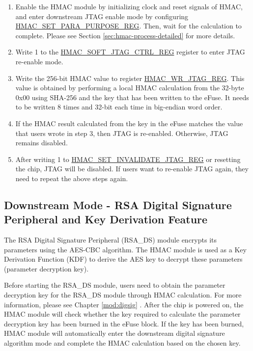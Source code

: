 \documentclass[main\_\_EN.tex]{subfiles}
\begin{document}
\begin{enumerate}
\item Enable the HMAC module by initializing clock and reset signals of HMAC, and enter downstream JTAG enable mode by configuring \hyperref[regdesc:HMACSETPARAPURPOSEREG]{HMAC\_SET\_PARA\_PURPOSE\_REG}. Then, wait for the calculation to complete. Please see Section \ref{sec:hmac-process-detailed} for more details.
\item Write 1 to the \hyperref[regdesc:HMACSOFTJTAGCTRLREG]{HMAC\_SOFT\_JTAG\_CTRL\_REG} register to enter JTAG re-enable mode.
\item Write the 256-bit HMAC value to register \hyperref[regdesc:HMACWRJTAGREG]{HMAC\_WR\_JTAG\_REG}. This value is obtained by performing a local HMAC calculation from the 32-byte 0x00 using SHA-256 and the key that has been written to the eFuse. It needs to be written 8 times and 32-bit each time in big-endian word order.
\item If the HMAC result calculated from the key in the eFuse matches the value that users wrote in step 3, then JTAG is re-enabled. Otherwise, JTAG remains disabled.
\item After writing 1 to \hyperref[regdesc:HMACSETINVALIDATEJTAGREG]{HMAC\_SET\_INVALIDATE\_JTAG\_REG} or resetting the chip, JTAG will be disabled. If users want to re-enable JTAG again, they need to repeat the above steps again.
\end{enumerate}

\subsection{Downstream Mode - RSA Digital Signature Peripheral and Key Derivation Feature}

The RSA Digital Signature Peripheral (RSA\_DS) module encrypts its parameters using the AES-CBC algorithm. The HMAC module is used as a Key Derivation Function (KDF) to derive the AES key to decrypt these parameters (parameter decryption key).

Before starting the RSA\_DS module, users need to obtain the parameter decryption key for the RSA\_DS module through HMAC calculation. For more information, please see Chapter \ref{mod:digsig} \textit{}. After the chip is powered on, the HMAC module will check whether the key required to calculate the parameter decryption key has been burned in the eFuse block. If the key has been burned, HMAC module will automatically enter the downstream digital signature algorithm mode and complete the HMAC calculation based on the chosen key.
\end{document}
